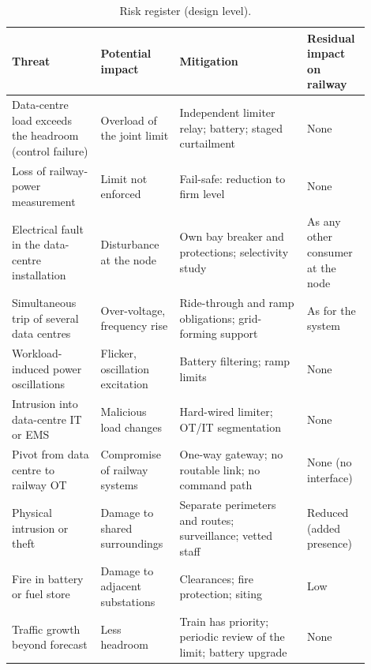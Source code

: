\begin{table}[t]
\caption{Risk register (design level).}
\label{tab:risk}
\centering\scriptsize
\begin{tabular}{p{0.23\linewidth}p{0.2\linewidth}p{0.33\linewidth}p{0.14\linewidth}}
\toprule
Threat & Potential impact & Mitigation & Residual impact on railway\\
\midrule
Data-centre load exceeds the headroom (control failure) & Overload of the joint limit & Independent limiter relay; battery; staged curtailment & None\\
Loss of railway-power measurement & Limit not enforced & Fail-safe: reduction to firm level & None\\
Electrical fault in the data-centre installation & Disturbance at the node & Own bay breaker and protections; selectivity study & As any other consumer at the node\\
Simultaneous trip of several data centres & Over-voltage, frequency rise & Ride-through and ramp obligations; grid-forming support & As for the system\\
Workload-induced power oscillations & Flicker, oscillation excitation & Battery filtering; ramp limits & None\\
Intrusion into data-centre IT or EMS & Malicious load changes & Hard-wired limiter; OT/IT segmentation & None\\
Pivot from data centre to railway OT & Compromise of railway systems & One-way gateway; no routable link; no command path & None (no interface)\\
Physical intrusion or theft & Damage to shared surroundings & Separate perimeters and routes; surveillance; vetted staff & Reduced (added presence)\\
Fire in battery or fuel store & Damage to adjacent substations & Clearances; fire protection; siting & Low\\
Traffic growth beyond forecast & Less headroom & Train has priority; periodic review of the limit; battery upgrade & None\\
\bottomrule
\end{tabular}
\end{table}
